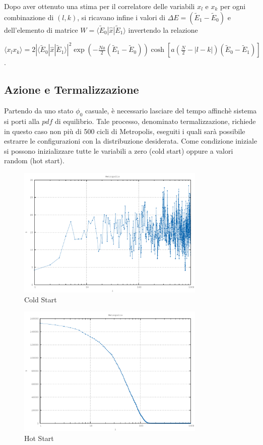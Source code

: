 Dopo aver ottenuto una stima per il correlatore delle variabili $x_l$ e $x_k$ per ogni combinazione di $(l,k)$, si ricavano infine i valori di $\Delta E=(\tilde{E}_1-\tilde{E}_0)$ e dell'elemento di matrice $W=\langle\tilde{E}_0|\hat{x}|\tilde{E}_1\rangle$ invertendo la relazione
\begin{center}
\small
$\langle x_l x_k\rangle = 2|\langle\tilde{E}_0|\hat{x}|\tilde{E}_1\rangle|^2\exp\left(-\frac{Na}{2}(\tilde{E}_1-\tilde{E}_0)\right)\cosh\left[a\left(\frac{N}{2}-|l-k|\right)(\tilde{E}_0-\tilde{E}_1)\right]$.
\end{center}

\subsection{Azione e Termalizzazione}

Partendo da uno stato $\phi_0$ casuale, è necessario lasciare del tempo affinchè sistema si porti alla $pdf$ di equilibrio. Tale processo, denominato termalizzazione, richiede in questo caso non più di 500 cicli di Metropolis, eseguiti i quali sarà possibile estrarre le configurazioni con la distribuzione desiderata. Come condizione iniziale si possono inizializzare tutte le variabili a zero (cold start) oppure a valori random (hot start).
\begin{figure}[H]
\centering
\includegraphics[width=0.8\textwidth]{action1}
\caption{Cold Start}
\label{fig:action1}
\end{figure}
\begin{figure}[H]
\centering
\includegraphics[width=0.8\textwidth]{action2}
\caption{Hot Start}
\label{fig:action2}
\end{figure}

